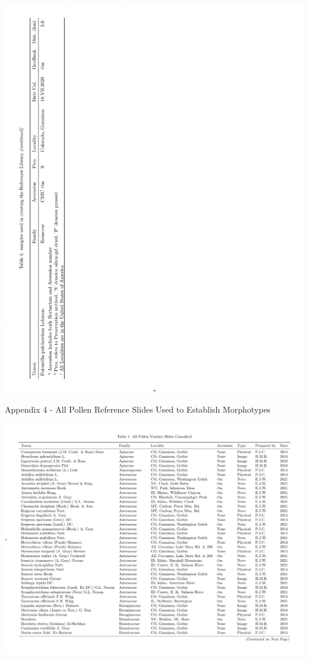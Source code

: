 \documentclass[
]{article}
\begin{document}
\includegraphics{../graphics/tables/specimen_tables-2.pdf}

\newpage

Appendix 4 - All Pollen Reference Slides Used to Establish Morphotypes

\includegraphics{../graphics/assorted/pollen_slide_table_reduced-1.pdf}
\end{document}
